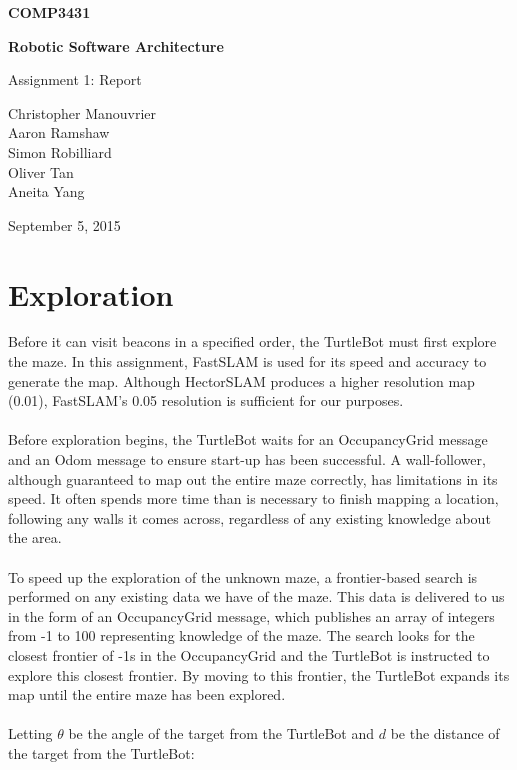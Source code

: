 \documentclass[titlepage,12pt,a4paper]{article}
\begin{document}
\begin{titlepage}
    \begin{center}
        \vspace*{3cm}
        
        \Huge
        \textbf{COMP3431\\}
        \title{}
        \vspace{0.5cm}
        \Huge
        \textbf{Robotic Software Architecture}
        
        \vspace{0.54cm}
        
        \Large
        Assignment 1: Report
        
        \vspace{5cm}

	\normalsize
	Christopher Manouvrier\\
	Aaron Ramshaw\\
	Simon Robilliard\\
	Oliver Tan\\
	Aneita Yang
        
	\vfill
        
        \Large
        September 5, 2015
        
    \end{center}
\end{titlepage}

\pagebreak

\section*{Exploration}

Before it can visit beacons in a specified order, the TurtleBot must first explore the maze. In this assignment, FastSLAM is used for its speed and accuracy to generate the map. Although HectorSLAM produces a higher resolution map (0.01), FastSLAM's 0.05 resolution is sufficient for our purposes. \\
\\
Before exploration begins, the TurtleBot waits for an OccupancyGrid message and an Odom message to ensure start-up has been successful. A wall-follower, although guaranteed to map out the entire maze correctly, has limitations in its speed. It often spends more time than is necessary to finish mapping a location, following any walls it comes across, regardless of any existing knowledge about the area.\\
\\
To speed up the exploration of the unknown maze, a frontier-based search is performed on any existing data we have of the maze. This data is delivered to us in the form of an OccupancyGrid message, which publishes an array of integers from -1 to 100 representing knowledge of the maze. The search looks for the closest frontier of -1s in the OccupancyGrid and the TurtleBot is instructed to explore this closest frontier. By moving to this frontier, the TurtleBot expands its map until the entire maze has been explored. \\
\\
Letting $\theta$ be the angle of the target from the TurtleBot and $d$ be the distance of the target from the TurtleBot: \\
\end{document}
